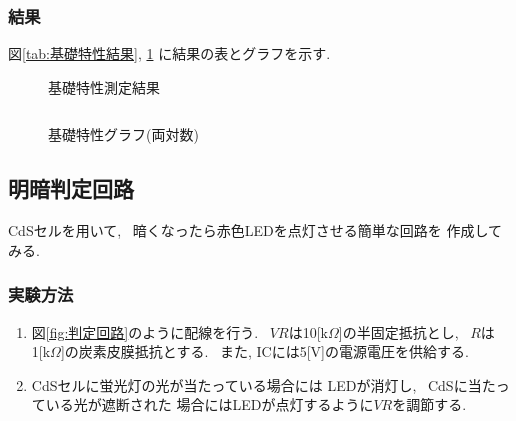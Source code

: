 \documentclass[titlepage]{jsarticle}
\begin{document}
        \subsubsection{結果}
            図\ref{tab:基礎特性結果}, \ref{fig:基礎特性グラフ}
            に結果の表とグラフを示す.

            \begin{figure}[ht]
                \def\@captype{table}
                \begin{minipage}{0.5\hsize}
                    \begin{center}
                        \caption{基礎特性測定結果}
                        \label{tab:基礎特性結果}
                        \begin{tabular}{c|c}
                            
                        \end{tabular}
                    \end{center}
                \end{minipage}
                \begin{minipage}{0.5\hsize}
                    \begin{center}
                        \caption{基礎特性グラフ(両対数)}
                        \label{fig:基礎特性グラフ}
                    \end{center}
                \end{minipage}
            \end{figure}

    \subsection{明暗判定回路} \label{明暗判定回路}
        CdSセルを用いて, ~暗くなったら赤色LEDを点灯させる簡単な回路を
        作成してみる.

        \subsubsection{実験方法}
            \begin{enumerate}
                \item 図\ref{fig:判定回路}のように配線を行う.
                    ~$VR$は10[k$\Omega$]の半固定抵抗とし,
                    ~$R$は1[k$\Omega$]の炭素皮膜抵抗とする.
                    ~また, ICには5[V]の電源電圧を供給する.
                \item CdSセルに蛍光灯の光が当たっている場合には
                    LEDが消灯し, ~CdSに当たっている光が遮断された
                    場合にはLEDが点灯するように$VR$を調節する.
            \end{enumerate}
\end{document}

